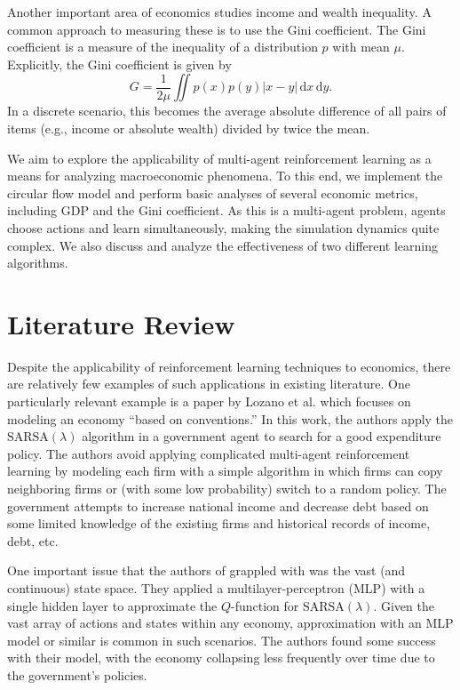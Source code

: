 \documentclass[twoside,twocolumn]{article}
\begin{document}
\medskip

Another important area of economics studies income and wealth inequality. A common approach to measuring these is to use the Gini coefficient. The Gini coefficient is a measure of the inequality of a distribution $p$ with mean $\mu$. Explicitly, the Gini coefficient is given by 
\[
  G = \frac{1}{2\mu} \iint p(x)p(y)|x - y|\, \mathrm{d}x\, \mathrm{d}y.
\] 
In a discrete scenario, this becomes the average absolute difference of all pairs of items (e.g., income or absolute wealth) divided by twice the mean.

\medskip 

We aim to explore the applicability of multi-agent reinforcement learning as a means for analyzing macroeconomic phenomena. To this end, we implement the circular flow model and perform basic analyses of several economic metrics, including GDP and the Gini coefficient. As this is a multi-agent problem, agents choose actions and learn simultaneously, making the simulation dynamics quite complex. We also discuss and analyze the effectiveness of two different learning algorithms.


\section{Literature Review}

Despite the applicability of reinforcement learning techniques to economics, there are relatively few examples of such applications in existing literature. One particularly relevant example is a paper by Lozano et al. \cite{RePEc:col:000092:003907} which focuses on modeling an economy ``based on conventions.'' In this work, the authors apply the $\text{SARSA}(\lambda)$ algorithm in a government agent to search for a good expenditure policy. The authors avoid applying complicated multi-agent reinforcement learning by modeling each firm with a simple algorithm in which firms can copy neighboring firms or (with some low probability) switch to a random policy. The government attempts to increase national income and decrease debt based on some limited knowledge of the existing firms and historical records of income, debt, etc. 

\medskip

One important issue that the authors of \cite{RePEc:col:000092:003907} grappled with was the vast (and continuous) state space. They applied a multilayer-perceptron (MLP) with a single hidden layer to approximate the $Q$-function for $\text{SARSA}(\lambda)$. Given the vast array of actions and states within any economy, approximation with an MLP model or similar is common in such scenarios. The authors found some success with their model, with the economy collapsing less frequently over time due to the government's policies.
\end{document}
